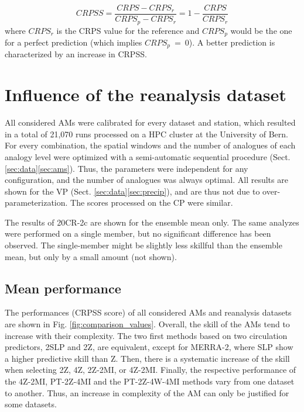 \documentclass{ametsoc}
\begin{document}
\begin{equation}
\label{eq:CRPSS}
CRPSS = \frac{CRPS-CRPS_{r}}{CRPS_{p}-CRPS_{r}} = 1-\frac{CRPS}{CRPS_{r}}
\end{equation}
where $CRPS_{r}$ is the CRPS value for the reference and $CRPS_{p}$ would be the one for a perfect prediction (which implies $CRPS_{p}~=~0$). A better prediction is characterized by an increase in CRPSS.



\section{Influence of the reanalysis dataset}

All considered AMs were calibrated for every dataset and station, which resulted in a total of 21,070 runs processed on a HPC cluster at the University of Bern. For every combination, the spatial windows and the number of analogues of each analogy level were optimized with a semi-automatic sequential procedure (Sect. \ref{sec:data}\ref{sec:ams}). Thus, the parameters were independent for any configuration, and the number of analogues was always optimal. All results are shown for the VP (Sect. \ref{sec:data}\ref{sec:precip}), and are thus not due to over-parameterization. The scores processed on the CP were similar.

The results of 20CR-2c are shown for the ensemble mean only. The same analyzes were performed on a single member, but no significant difference has been observed. The single-member might be slightly less skillful than the ensemble mean, but only by a small amount (not shown).


\subsection{Mean performance}

The performances (CRPSS score) of all considered AMs and reanalysis datasets are shown in Fig. \ref{fig:comparison_values}. Overall, the skill of the AMs tend to increase with their complexity. The two first methods based on two circulation predictors, 2SLP and 2Z, are equivalent, except for MERRA-2, where SLP show a higher predictive skill than Z. Then, there is a systematic increase of the skill when selecting 2Z, 4Z, 2Z-2MI, or 4Z-2MI. Finally, the respective performance of the 4Z-2MI, PT-2Z-4MI and the PT-2Z-4W-4MI methods vary from one dataset to another. Thus, an increase in complexity of the AM can only be justified for some datasets.
\end{document}

